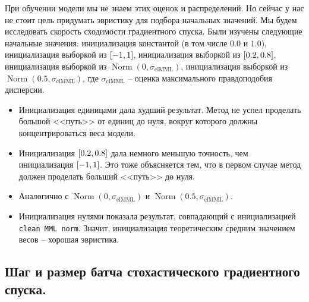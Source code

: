 \documentclass[12pt]{extarticle}
\DeclareMathOperator{\N}{\text{Norm}}
\let\U\relax
\DeclareMathOperator{\U}{\text{Uniform}}
\begin{document}
При обучении модели мы не знаем этих оценок и распределений. Но сейчас у нас не стоит цель придумать эвристику для подбора начальных значений. Мы будем исследовать скорость сходимости градиентного спуска. Были изучены следующие начальные значения: инициализация константой (в том числе $0.0$ и $1.0$), инициализация выборкой из $\U[-1,1]$, инициализация выборкой из $\U[0.2,0.8]$, инициализация выборкой из $\N(0, \sigma_\text{clMML})$, инициализация выборкой из $\N(0.5,\sigma_\text{clMML})$, где $\sigma_\text{clMML}$ -- оценка максимального правдоподобия дисперсии.


\begin{itemize}
    \item Инициализация единицами дала худший результат. Метод не успел проделать большой <<путь>> от единиц до нуля, вокруг которого должны концентрироваться веса модели.
    \item Инициализация $\U[0.2,0.8]$ дала немного меньшую точность, чем инициализация $\U[-1,1]$. Это тоже объясняется тем, что в первом случае метод должен проделать больший <<путь>> до нуля.
    \item Аналогично с $\N(0,\sigma_\text{clMML})$ и $\N(0.5,\sigma_\text{clMML})$.
    \item Инициализация нулями показала результат, совпадающий с инициализацией \texttt{clean MML norm}. Значит, инициализация теоретическим средним значением весов -- хорошая эвристика.
\end{itemize}

\subsection{Шаг и размер батча стохастического градиентного спуска.}
\end{document}
